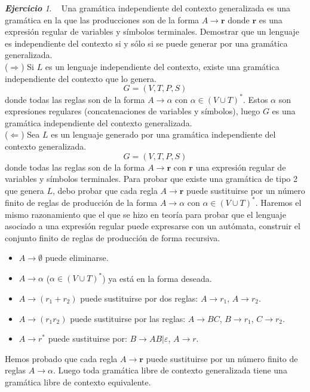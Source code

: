 \documentclass[12pt,spanish]{article}
\theoremstyle{definition}
\theoremstyle{remark}
\newtheorem{exercise}{\textbf{Ejercicio}}%
\begin{document}
\newpage

\setcounter{exercise}{15}

\begin{exercise}~ Una gramática independiente del contexto
  generalizada es una gramática en la que las producciones son de la
  forma $A\rightarrow \textbf{r}$ donde $\textbf{r}$ es una expresión
  regular de variables y símbolos terminales. Demostrar que un
  lenguaje es independiente del contexto si y sólo si se puede generar
  por una gramática generalizada. \\

  ($\Longrightarrow$) Si $L$ es un lenguaje independiente del contexto,
  existe una gramática independiente del contexto que lo genera.
  \[G=(V,T,P,S)\] donde todas las reglas son de la forma
  $A\rightarrow \alpha$ con $\alpha \in (V \cup T)^*$. Estos $\alpha$
  son expresiones regulares (concatenaciones de variables y símbolos),
  luego $G$ es una gramática independiente del contexto generalizada. \\

  ($\Longleftarrow$) Sea $L$ es un lenguaje generado por una gramática
  independiente del contexto generalizada.
  \[G=(V,T,P,S)\] donde todas las reglas son de la forma
  $A\rightarrow \textbf{r}$ con $\textbf{r}$ una expresión regular de
  variables y símbolos terminales. Para probar que existe una
  gramática de tipo 2 que genera $L$, debo probar que cada regla
  $A\rightarrow \textbf{r}$ puede sustituirse por un número finito de
  reglas de producción de la forma $A\rightarrow \alpha$ con
  $\alpha \in (V\cup T)^*$. Haremos el mismo razonamiento que el que
  se hizo en teoría para probar que el lenguaje asociado a una
  expresión regular puede expresarse con un autómata, construir el
  conjunto finito de reglas de producción de forma recursiva.

  \begin{itemize}
  \item $A\rightarrow\emptyset$ puede eliminarse.
  \item $A\rightarrow\alpha$ \quad ($\alpha \in (V \cup T)^*$) ya está en la
    forma deseada.
  \item $A\rightarrow (r_1+r_2)$ puede sustituirse por dos reglas:
    $A\rightarrow r_1$, $A\rightarrow r_2$.
  \item $A\rightarrow (r_1r_2)$ puede sustituirse por las reglas:
    $A\rightarrow BC$, $B\rightarrow r_1$, $C\rightarrow r_2$.
  \item $A\rightarrow r^*$ puede sustituirse por:
    $B\rightarrow AB|\varepsilon$, $A\rightarrow r$.
  \end{itemize}

  Hemos probado que cada regla $A\rightarrow \textbf{r}$ puede
  sustituirse por un número finito de reglas $A\rightarrow
  \alpha$. Luego toda gramática libre de contexto generalizada tiene
  una gramática libre de contexto equivalente.
\end{exercise}
\end{document}

